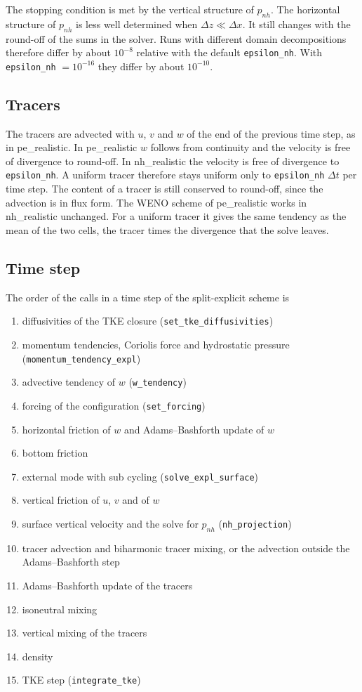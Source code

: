 \documentclass[12pt]{article}
\begin{document}
The stopping condition is met by the vertical structure of $p_{nh}$.
The horizontal structure of $p_{nh}$ is less well determined when $\Delta z \ll \Delta x$.
It still changes with the round-off of the sums in the solver.
Runs with different domain decompositions therefore differ by about $10^{-8}$ relative with the default \verb|epsilon_nh|.
With \verb|epsilon_nh| $= 10^{-16}$ they differ by about $10^{-10}$.

\subsection*{Tracers}

The tracers are advected with $u$, $v$ and $w$ of the end of the previous time step, as in pe\_realistic.
In pe\_realistic $w$ follows from continuity and the velocity is free of divergence to round-off.
In nh\_realistic the velocity is free of divergence to \verb|epsilon_nh|.
A uniform tracer therefore stays uniform only to \verb|epsilon_nh| $\Delta t$ per time step.
The content of a tracer is still conserved to round-off, since the advection is in flux form.
The WENO scheme of pe\_realistic works in nh\_realistic unchanged.
For a uniform tracer it gives the same tendency as the mean of the two cells, the tracer times the divergence that the solve leaves.

\subsection*{Time step}

The order of the calls in a time step of the split-explicit scheme is
\begin{enumerate}
\item diffusivities of the TKE closure (\verb|set_tke_diffusivities|)
\item momentum tendencies, Coriolis force and hydrostatic pressure (\verb|momentum_tendency_expl|)
\item advective tendency of $w$ (\verb|w_tendency|)
\item forcing of the configuration (\verb|set_forcing|)
\item horizontal friction of $w$ and Adams--Bashforth update of $w$
\item bottom friction
\item external mode with sub cycling (\verb|solve_expl_surface|)
\item vertical friction of $u$, $v$ and of $w$
\item surface vertical velocity and the solve for $p_{nh}$ (\verb|nh_projection|)
\item tracer advection and biharmonic tracer mixing, or the advection outside the Adams--Bashforth step
\item Adams--Bashforth update of the tracers
\item isoneutral mixing
\item vertical mixing of the tracers
\item density
\item TKE step (\verb|integrate_tke|)
\end{enumerate}
\end{document}
